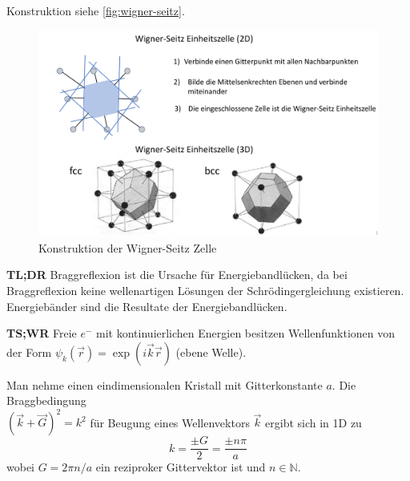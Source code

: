 Konstruktion siehe \autoref{fig:wigner-seitz}.
\begin{figure}[H]
    \centering
    \includegraphics[width=0.8\linewidth]{resources/15-06-2015/q33.png}
    \caption{Konstruktion der Wigner-Seitz Zelle}
    \label{fig:wigner-seitz}
\end{figure}

\label{q:34}

\label{q:35}

\label{q:36}

\label{q:37}

\textbf{TL;DR} Braggreflexion ist die Ursache für Energiebandlücken, da bei Braggreflexion keine wellenartigen Lösungen der Schrödingergleichung existieren.
Energiebänder sind die Resultate der Energiebandlücken.

\textbf{TS;WR} Freie $e^-$ mit kontinuierlichen Energien besitzen Wellenfunktionen von der Form $\psi_{k}(\vec{r}) = \exp(i\vec{k}\vec{r})$ (ebene Welle).

Man nehme einen eindimensionalen Kristall mit Gitterkonstante $a$.
Die Braggbedingung\\$\left(\vec{k} + \vec{G}\right)^2 = k^2$ für Beugung eines Wellenvektors $\vec{k}$ ergibt sich in 1D zu
\begin{equation}
    k = \frac{\pm G}{2} = \frac{\pm n \pi}{a}
\end{equation}
wobei $G = 2\pi n/a$ ein reziproker Gittervektor ist und $n \in \mathbb{N}$.

